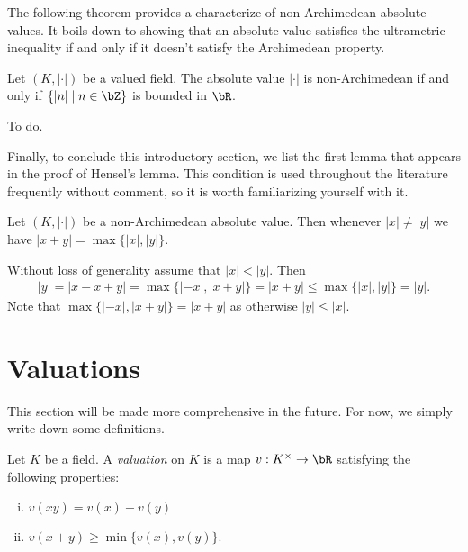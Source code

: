 The following theorem provides a characterize of non-Archimedean absolute values. It boils down to showing that an absolute value satisfies the ultrametric inequality if and only if it doesn't satisfy the Archimedean property.
\begin{thm}\label{thm:non-Arch-bounded-Z}
	Let $(K,|\cdot|)$ be a valued field. The absolute value $|\cdot|$ is non-Archimedean if and only if $\{|n| \mid n \in \bZ\}$ is bounded in $\bR$.
\end{thm}
\begin{prf}
	To do.
\end{prf}

Finally, to conclude this introductory section, we list the first lemma that appears in the proof of Hensel's lemma. This condition is used throughout the literature frequently without comment, so it is worth familiarizing yourself with it.
\begin{lem}\label{lem:case-of-equality}
	Let $(K,|\cdot|)$ be a non-Archimedean absolute value. Then whenever $|x| \neq |y|$ we have $|x+y| = \max\{|x|,|y|\}$.
\end{lem}
\begin{prf}
	Without loss of generality assume that $|x| < |y|$. Then
	\begin{align*}
		|y| = |x - x + y| = \max\{|-x|,|x+y|\} = |x+y| \leq \max\{|x|,|y|\} = |y|.
	\end{align*}
	Note that $\max\{|-x|,|x+y|\} = |x+y|$ as otherwise $|y| \leq |x|$.
\end{prf}

\section{Valuations}

This section will be made more comprehensive in the future. For now, we simply write down some definitions.

\begin{defn}\label{defn:valuation}
	Let $K$ be a field. A \emph{valuation} on $K$ is a map $v:K^\times \to \bR$ satisfying the following properties:
	\begin{enumerate}[(i)]
		\item $v(xy) = v(x) + v(y)$
		\item $v(x + y) \geq \min\{v(x),v(y)\}$.
	\end{enumerate}
\end{defn}

